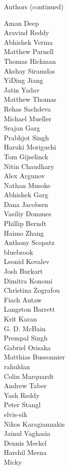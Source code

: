 \begin{frame}{Authors (continued)}
\begin{multicols}{5}
Aman Deep\\
Aravind Reddy\\
Abhishek Verma\\
Matthew Parnell\\
Thomas Hickman\\
Akshay Siramdas\\
YiDing Jiang\\
Jatin Yadav\\
Matthew Thomas\\
Rehas Sachdeva\\
Michael Mueller\\
Srajan Garg\\
Prabhjot Singh\\
Haruki Moriguchi\\
Tom Gijselinck\\
Nitin Chaudhary\\
Alex Argunov\\
Nathan Musoke\\
Abhishek Garg\\
Dana Jacobsen\\
Vasiliy Dommes\\
Phillip Berndt\\
Haimo Zhang\\
Anthony Scopatz\\
bluebrook\\
Leonid Kovalev\\
Josh Burkart\\
Dimitra Konomi\\
Christina Zografou\\
Fiach Antaw\\
Langston Barrett\\
Krit Karan\\
G. D. McBain\\
Prempal Singh\\
Gabriel Orisaka\\
Matthias Bussonnier\\
rahuldan\\
Colin Marquardt\\
Andrew Taber\\
Yash Reddy\\
Peter Stangl\\
elvis-sik\\
Nikos Karagiannakis\\
Jainul Vaghasia\\
Dennis Meckel\\
Harshil Meena\\
Micky\\

\end{multicols}
\end{frame}
